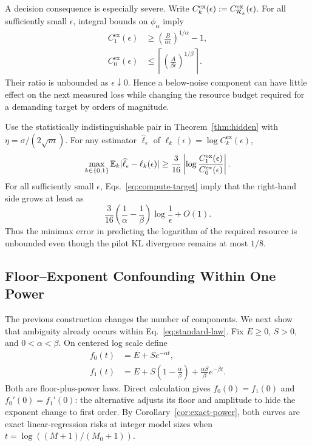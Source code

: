 A decision consequence is especially severe. Write
$C_k^{\mathrm{ex}}(\epsilon):=C_{\mathcal{R}_k}^{\mathrm{ex}}(\epsilon)$. For all sufficiently small $\epsilon$, integral bounds on $\phi_\alpha$ imply
\begin{align}
 C_1^{\mathrm{ex}}(\epsilon)
 &\ge \left(\frac{B}{\alpha\epsilon}\right)^{1/\alpha}-1,\\
 C_0^{\mathrm{ex}}(\epsilon)
 &\le \left\lceil
 \left(\frac{A}{\beta\epsilon}\right)^{1/\beta}\right\rceil.
 \label{eq:compute-target}
\end{align}
Their ratio is unbounded as $\epsilon\downarrow0$. Hence a below-noise component can have little effect on the next measured loss while changing the resource budget required for a demanding target by orders of magnitude.

\begin{corollary}
\label{cor:compute-minimax}
Use the statistically indistinguishable pair in Theorem~\ref{thm:hidden} with
$\eta=\sigma/(2\sqrt m)$. For any estimator $\widehat\ell_\epsilon$ of
$\ell_k(\epsilon)=\log C_k^{\mathrm{ex}}(\epsilon)$,
\begin{equation}
 \max_{k\in\{0,1\}}\mathbb{E}_k
 |\widehat\ell_\epsilon-\ell_k(\epsilon)|
 \ge \frac{3}{16}\left|\log
 \frac{C_1^{\mathrm{ex}}(\epsilon)}
 {C_0^{\mathrm{ex}}(\epsilon)}\right|.
 \label{eq:compute-minimax}
\end{equation}
For all sufficiently small $\epsilon$, Eqs.~\eqref{eq:compute-target} imply that the right-hand side grows at least as
\begin{equation}
 \frac{3}{16}\left(\frac1\alpha-\frac1\beta\right)
 \log\frac1\epsilon+O(1).
 \label{eq:compute-log-rate}
\end{equation}
Thus the minimax error in predicting the logarithm of the required resource is unbounded even though the pilot KL divergence remains at most $1/8$.
\end{corollary}

\subsection{Floor--Exponent Confounding Within One Power}

The previous construction changes the number of components. We next show that ambiguity already occurs within Eq.~\eqref{eq:standard-law}. Fix $E\ge0$, $S>0$, and $0<\alpha<\beta$. On centered log scale define
\begin{align}
 f_0(t)&=E+S e^{-\alpha t},\\
 f_1(t)&=E+S\left(1-\frac{\alpha}{\beta}\right)
       +\frac{\alpha S}{\beta}e^{-\beta t}.
 \label{eq:matched-pair}
\end{align}
Both are floor-plus-power laws. Direct calculation gives
$f_0(0)=f_1(0)$ and $f_0'(0)=f_1'(0)$: the alternative adjusts its floor and amplitude to hide the exponent change to first order.
By Corollary~\ref{cor:exact-power}, both curves are exact linear-regression risks at integer model sizes when $t=\log((M+1)/(M_0+1))$.


